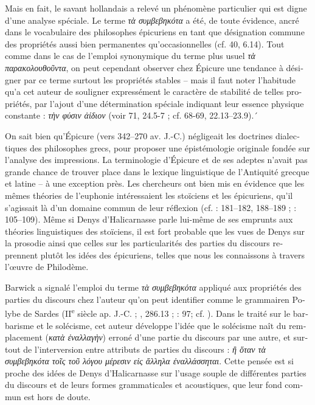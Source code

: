 \documentclass[output=paper]{langsci/langscibook}
\begin{document}
\begin{otherlanguage}{french}
Mais en fait, le savant hollandais a relevé un phénomène particulier qui est digne d’une analyse spéciale. Le terme \textit{τὰ συμβεβηκότα} a été, de toute évidence, ancré dans le vocabulaire des philosophes épicuriens en tant que désignation commune des propriétés aussi bien permanentes qu’occasionnelles (cf.  40, 6.14). Tout comme dans le cas de l’emploi synonymique du terme plus usuel \textit{τὰ παρακολουθοῦντα}, on peut cependant observer chez Épicure une tendance à désigner par ce terme surtout les propriétés stables – mais il faut noter l’habitude qu’a cet auteur de souligner expressément le caractère de stabilité de telles propriétés, par l’ajout d’une détermination spéciale indiquant leur essence physique constante : \textit{τὴν φύσιν ἀίδιον} (voir  71, 24.5-7 ; cf. 68-69, 22.13–23.9).´

On sait bien qu’Épicure (vers 342–270 av. J.-C.) négligeait les doctrines dialectiques des philosophes grecs, pour proposer une épistémologie originale fondée sur l’analyse des impressions. La terminologie d’Épicure et de ses adeptes n’avait pas grande chance de trouver place dans le lexique linguistique de l’Antiquité grecque et latine – à une exception près. Les chercheurs ont bien mis en évidence que les mêmes théories de l’euphonie intéressaient les stoïciens et les épicuriens, qu’il s’agissait là d’un domaine commun de leur réflexion (cf. \citealt{janko_philodemus._2000}: 181–182, 188–189 ; \citealt{campbell_philodenus_2002}: 105–109). Même si Denys d’Halicarnasse parle lui-même de ses emprunts aux théories linguistiques des stoïciens, il est fort probable que les vues de Denys sur la prosodie ainsi que celles sur les particularités des parties du discours reprennent plutôt les idées des épicuriens, telles que nous les connaissons à travers l’œuvre de Philodème.

Barwick a signalé l’emploi du terme \textit{τὰ συμβεβηκότα} appliqué aux propriétés des parties du discours chez l’auteur qu’on peut identifier comme le grammairen Polybe de Sardes (II\textsuperscript{e} siècle ap. J.-C. ; , 286.13 ; \citealt{barwick_remmius_1922}: 97; cf. \citealt{jones_polybius_1996}). Dans le traité sur le barbarisme et le solécisme, cet auteur développe l’idée que le solécisme naît du remplacement (\textit{κατὰ ἐναλλαγὴν}) erroné d’une partie du discours par une autre, et surtout de l’interversion entre attributs de parties du discours : \textit{ἢ ὅταν τὰ συμβεβηκότα τοῖς τοῦ λόγου μέρεσιν εἰς ἄλληλα ἐναλλάσσηται}. Cette pensée est si proche des idées de Denys d’Halicarnasse sur l’usage souple de différentes parties du discours et de leurs formes grammaticales et acoustiques, que leur fond commun est hors de doute. 


\end{otherlanguage}
\end{document}
